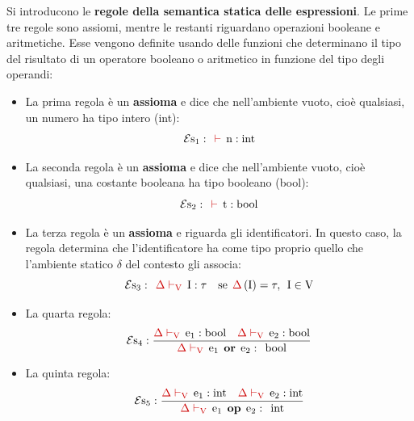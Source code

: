 \documentclass[a4paper]{article}
\begin{document}
	Si introducono le \textcolor{Red3}{\textbf{regole della semantica statica delle espressioni}}. Le prime tre regole sono assiomi, mentre le restanti riguardano operazioni booleane e aritmetiche. Esse vengono definite usando delle funzioni che determinano il tipo del risultato di un operatore booleano o aritmetico in funzione del tipo degli operandi:
	\begin{itemize}
		\item La prima regola è un \textbf{assioma} e dice che nell'ambiente vuoto, cioè qualsiasi, un numero ha tipo intero (int):
		\begin{equation*}
			\mathcal{E}\mathrm{s}_{1} : \:\: \textcolor{Red3}{\vdash} \:\: \mathrm{n}:\mathrm{int}
		\end{equation*}
	
		\item La seconda regola è un \textbf{assioma} e dice che nell'ambiente vuoto, cioè qualsiasi, una costante booleana ha tipo booleano (bool):
		\begin{equation*}
			\mathcal{E}\mathrm{s}_{2} : \:\: \textcolor{Red3}{\vdash} \:\: \mathrm{t}:\mathrm{bool}
		\end{equation*}
	
		\item La terza regola è un \textbf{assioma} e riguarda gli identificatori. In questo caso, la regola determina che l'identificatore ha come tipo proprio quello che l'ambiente statico $\delta$ del contesto gli associa:
		\begin{equation*}
			\mathcal{E}\mathrm{s}_{3} : \:\: \textcolor{Red3}{\Delta\vdash_{\mathrm{V}}} \:\: \mathrm{I}:\tau \hspace{1em} \mathrm{se} \:\: \textcolor{Red3}{\Delta}\left(\mathrm{I}\right) = \tau, \:\: \mathrm{I} \in \mathrm{V}
		\end{equation*}
	
		\item La quarta regola:
		\begin{equation*}
			\mathcal{E}\mathrm{s}_{4}: \dfrac{
				\textcolor{Red3}{\Delta\vdash_{\mathrm{V}}} \:\: \mathrm{e}_{1}:\mathrm{bool} \hspace{1em}
				\textcolor{Red3}{\Delta\vdash_{\mathrm{V}}} \:\: \mathrm{e}_{2}:\mathrm{bool}
			}{
				\textcolor{Red3}{\Delta\vdash_{\mathrm{V}}} \:\: \mathrm{e}_{1} \:\: \mathbf{or} \:\: \mathrm{e}_{2}: \:\: \mathrm{bool}
			}
		\end{equation*}
	
		\item La quinta regola:
		\begin{equation*}
			\mathcal{E}\mathrm{s}_{5}: \dfrac{
				\textcolor{Red3}{\Delta\vdash_{\mathrm{V}}} \:\: \mathrm{e}_{1}:\mathrm{int} \hspace{1em}
				\textcolor{Red3}{\Delta\vdash_{\mathrm{V}}} \:\: \mathrm{e}_{2}:\mathrm{int}
			}{
				\textcolor{Red3}{\Delta\vdash_{\mathrm{V}}} \:\: \mathrm{e}_{1} \:\: \mathbf{op} \:\: \mathrm{e}_{2}: \:\: \mathrm{int}
			}
		\end{equation*}
	

\end{itemize}
\end{document}

